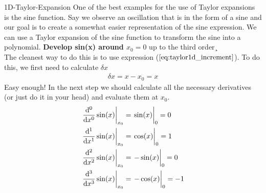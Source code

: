 \begin{examplebox}{1D-Taylor-Expansion}
	\label{ex:1d-taylor}
	One of the best examples for the use of Taylor expansions is the sine function. 
	Say we observe an oscillation that is in the form of a sine and our goal is to create a somewhat easier representation of the sine expression. We can use a Taylor expansion of the sine function to transform the sine into a polynomial. 
	\tcblower 
	\textbf{Develop sin(x) around $x_0 = 0$} up to the third order¸\\
	The cleanest way to do this is to use expression ($\ref{eq:taylor1d_increment}$). To do this, we first need to calculate $\delta x$
	\begin{align*}
		\delta x = x - x_0 = x 
	\end{align*}
	Easy enough! In the next step we should calculate all the necessary derivatives (or just do it in your head) and evaluate them at $x_0$.
	\begin{align}
		\eval{\dv[0]{}{x}\sin(x)}_{x_0} &= \eval{\sin(x)}_0 = 0 \\
		\eval{\dv[1]{}{x}\sin(x)}_{x_0} &= \eval{\cos(x)}_0 = 1\\
		\eval{\dv[2]{}{x}\sin(x)}_{x_0} &= \eval{-\sin(x)}_0 = 0\\
		\eval{\dv[3]{}{x}\sin(x)}_{x_0} &= \eval{-\cos(x)}_0 = -1\\
	\end{align}
	

\end{examplebox}
